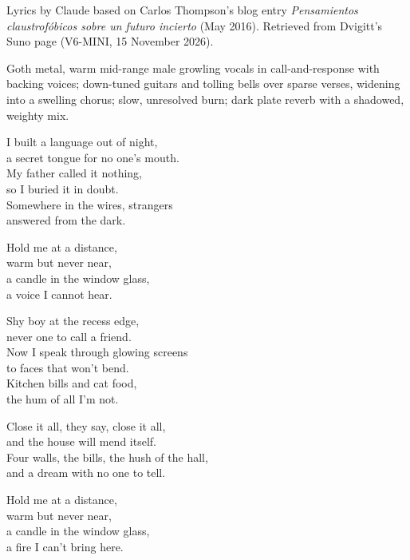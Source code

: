 
\begin{notes}
Lyrics by Claude based on Carlos Thompson's blog entry \emph{Pensamientos claustrofóbicos sobre un futuro incierto} (May 2016). Retrieved from Dvigitt's Suno page (V6-MINI, 15 November 2026).
\end{notes}
\begin{style}
Goth metal, warm mid-range male growling vocals in call-and-response with backing voices; down-tuned guitars and tolling bells over sparse verses, widening into a swelling chorus; slow, unresolved burn; dark plate reverb with a shadowed, weighty mix.
\end{style}
\begin{lyrics}
I built a language out of night,\\
a secret tongue for no one’s mouth.\\
My father called it nothing,\\
so I buried it in doubt.\\
Somewhere in the wires, strangers\\
answered from the dark.

Hold me at a distance,\\
warm but never near,\\
a candle in the window glass,\\
a voice I cannot hear.

Shy boy at the recess edge,\\
never one to call a friend.\\
Now I speak through glowing screens\\
to faces that won’t bend.\\
Kitchen bills and cat food,\\
the hum of all I’m not.

Close it all, they say, close it all,\\
and the house will mend itself.\\
Four walls, the bills, the hush of the hall,\\
and a dream with no one to tell.

Hold me at a distance,\\
warm but never near,\\
a candle in the window glass,\\
a fire I can’t bring here.


\end{lyrics}
